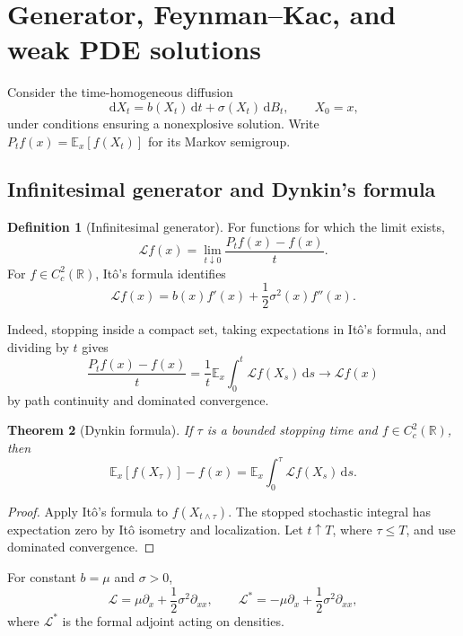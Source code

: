 \documentclass[10pt,a4paper]{article}
\numberwithin{equation}{section}
\theoremstyle{blueplain}
\newtheorem{theorem}{Theorem}[section]
\theoremstyle{definition}
\newtheorem{definition}[theorem]{Definition}
\newcommand{\E}{\mathbb E}
\newcommand{\R}{\mathbb R}
\newcommand{\dd}{\,\mathrm d}
\begin{document}
\clearpage
\section{Generator, Feynman--Kac, and weak PDE solutions}
\label{sec:pde-bridge}

Consider the time-homogeneous diffusion
\begin{equation}
  \dd X_t=b(X_t)\dd t+\sigma(X_t)\dd B_t,
  \qquad X_0=x,
  \label{eq:general-diffusion}
\end{equation}
under conditions ensuring a nonexplosive solution.  Write
\(P_tf(x)=\E_x[f(X_t)]\) for its Markov semigroup.

\subsection{Infinitesimal generator and Dynkin's formula}

\begin{definition}[Infinitesimal generator]
For functions for which the limit exists,
\[
  \mathcal Lf(x)=\lim_{t\downarrow0}\frac{P_tf(x)-f(x)}t.
\]
For \(f\in C_c^2(\R)\), It\^o's formula identifies
\begin{equation}
  \mathcal Lf(x)
  =b(x)f'(x)+\frac12\sigma^2(x)f''(x).
  \label{eq:diffusion-generator}
\end{equation}
\end{definition}

Indeed, stopping inside a compact set, taking expectations in It\^o's formula,
and dividing by \(t\) gives
\[
 \frac{P_tf(x)-f(x)}t
 =\frac1t\E_x\int_0^t\mathcal Lf(X_s)\dd s
 \longrightarrow\mathcal Lf(x)
\]
by path continuity and dominated convergence.

\begin{theorem}[Dynkin formula]
If \(\tau\) is a bounded stopping time and \(f\in C_c^2(\R)\), then
\begin{equation}
  \E_x[f(X_\tau)]-f(x)
  =\E_x\int_0^\tau\mathcal Lf(X_s)\dd s.
  \label{eq:dynkin-formula}
\end{equation}
\end{theorem}

\begin{proof}
Apply It\^o's formula to \(f(X_{t\wedge\tau})\).  The stopped stochastic
integral has expectation zero by It\^o isometry and localization.  Let
\(t\uparrow T\), where \(\tau\le T\), and use dominated convergence.
\end{proof}

For constant \(b=\mu\) and \(\sigma>0\),
\begin{equation}
  \mathcal L=\mu\partial_x+\frac12\sigma^2\partial_{xx},
  \qquad
  \mathcal L^*=-\mu\partial_x+\frac12\sigma^2\partial_{xx},
  \label{eq:generator-and-adjoint}
\end{equation}
where \(\mathcal L^*\) is the formal adjoint acting on densities.
\end{document}
